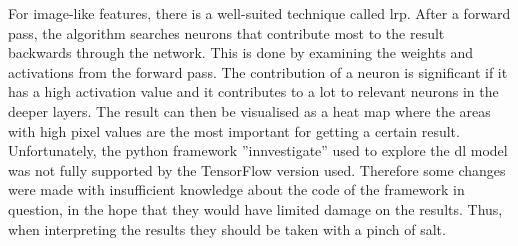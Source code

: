 For image-like features, there is a well-suited technique called \gls{lrp}.
After a forward pass, the algorithm searches neurons that contribute most to the result backwards through the network.
This is done by examining the weights and activations from the forward pass. The contribution of a neuron is significant if it has a high activation value and it contributes to a lot to relevant neurons in the deeper layers.
The result can then be visualised as a heat map where the areas with high pixel values are the most important for getting a certain result.
Unfortunately, the python framework ”innvestigate” used to explore the \gls{dl} model was not fully supported by the TensorFlow version used.
Therefore some changes were made with insufficient knowledge about the code of the framework in question, in the hope that they would have limited damage on the results. Thus, when interpreting the results they should be taken with a pinch of salt.
